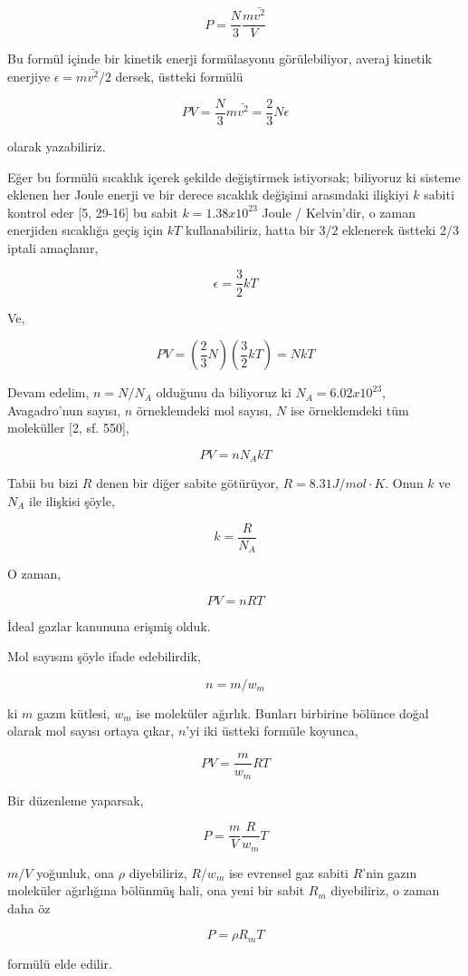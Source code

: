 \documentclass[12pt,fleqn]{article}\usepackage{../../common}
\begin{document}
$$
P = \frac{N}{3} \frac{m \bar{v^2}}{V}
$$

Bu formül içinde bir kinetik enerji formülasyonu görülebiliyor, averaj kinetik
enerjiye $\epsilon = m \bar{v^2} / 2$ dersek, üstteki formülü

$$
PV = \frac{N}{3} m \bar{v^2} = \frac{2}{3} N \epsilon
$$

olarak yazabiliriz.

Eğer bu formülü sıcaklık içerek şekilde değiştirmek istiyorsak; biliyoruz ki
sisteme eklenen her Joule enerji ve bir derece sıcaklık değişimi arasındaki
ilişkiyi $k$ sabiti kontrol eder [5, 29-16] bu sabit $k = 1.38 x 10^{23}$ Joule
/ Kelvin'dir, o zaman enerjiden sıcaklığa geçiş için $kT$ kullanabiliriz, hatta
bir $3/2$ eklenerek üstteki 2/3 iptali amaçlanır,

$$
\epsilon = \frac{3}{2} k T
$$

Ve,

$$
PV = \left( \frac{2}{3} N \right) \left( \frac{3}{2} k T \right) = N k T
$$

Devam edelim, $n = N / N_A$ olduğunu da biliyoruz ki $N_A = 6.02 x 10^{23}$,
Avagadro'nun sayısı, $n$ örneklemdeki mol sayısı, $N$ ise örneklemdeki tüm
moleküller [2, sf. 550],

$$
PV = n N_A k T
$$

Tabii bu bizi $R$ denen bir diğer sabite götürüyor, $R = 8.31 J/mol \cdot
K$. Onun $k$ ve $N_A$ ile ilişkisi şöyle,

$$
k = \frac{R}{N_A}
$$

O zaman,

$$
PV = n R T
$$

İdeal gazlar kanununa erişmiş olduk.


Mol sayısını şöyle ifade edebilirdik,

$$
n = m / w_m
$$

ki $m$ gazın kütlesi, $w_m$ ise moleküler ağırlık. Bunları birbirine bölünce
doğal olarak mol sayısı ortaya çıkar, $n$'yi iki üstteki formüle koyunca,

$$
PV = \frac{m}{w_m} R T
$$

Bir düzenleme yaparsak,

$$
P = \frac{m}{V} \frac{R}{w_m} T
$$

$m/V$ yoğunluk, ona $\rho$ diyebiliriz, $R / w_m$ ise evrensel gaz
sabiti $R$'nin gazın moleküler ağırlığına bölünmüş hali, ona
yeni bir sabit $R_m$ diyebiliriz, o zaman daha öz

$$
P = \rho R_m T
$$

formülü elde edilir.
\end{document}
